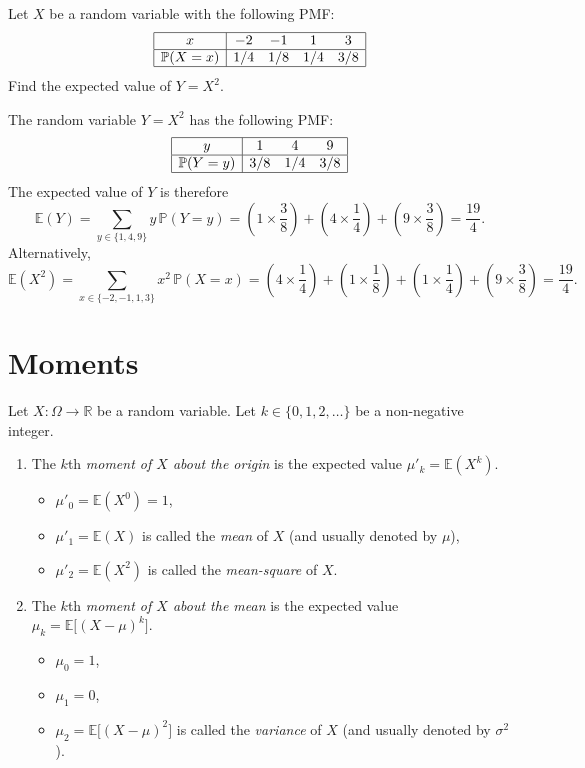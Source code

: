 \documentclass[lecture]{csm}
\newcommand{\R}{\mathbb{R}}
\newcommand{\prob}{\mathbb{P}}
\newcommand{\expe}{\mathbb{E}}
\def\it{\item}
\def\bit{\begin{itemize}}
\def\eit{\end{itemize}}
\def\ben{\begin{enumerate}}
\def\een{\end{enumerate}}
\begin{document}
\begin{example}
Let $X$ be a random variable with the following PMF:
\[\begin{array}{|c|cccc|}\hline
x 			& -2		& -1		& 1		& 3	\\ \hline
\prob(X=x)	& 1/4	& 1/8	& 1/4	& 3/8 \\ \hline
\end{array}\]
Find the expected value of $Y=X^2$.
\end{example}

\begin{solution}
The random variable $Y=X^2$ has the following PMF:
\[\begin{array}{|c|ccc|}\hline
y			& 1		& 4		& 9	\\ \hline
\prob(Y=y)	& 3/8	& 1/4	& 3/8	\\ \hline
\end{array}\]
The expected value of $Y$ is therefore
\[
\expe(Y) 
	= \sum_{y\in\{1,4,9\}} y\,\prob(Y=y) 
	= \left(1\times\frac{3}{8}\right) + \left(4\times\frac{1}{4}\right) + \left(9\times\frac{3}{8}\right) 
	= \frac{19}{4}.
\]
Alternatively,
\[
\expe(X^2)
	= \sum_{x\in\{-2,-1,1,3\}} x^2\,\prob(X=x) 
	= \left(4\times\frac{1}{4}\right) + \left(1\times\frac{1}{8}\right) + \left(1\times\frac{1}{4}\right) + \left(9\times\frac{3}{8}\right) 
	= \frac{19}{4}.
\]
\end{solution}


\section{Moments} 

\begin{definition}
Let $X:\Omega\to\R$ be a random variable. Let $k\in\{0,1,2,\ldots\}$ be a non-negative integer.
\ben
\it The $k$th \emph{moment of $X$ about the origin} is the expected value $\mu'_k = \expe(X^k)$.
	\bit
	\it $\mu'_0 = \expe(X^0) = 1$,
	\it $\mu'_1 = \expe(X)$ is called the \emph{mean} of $X$ (and usually denoted by $\mu$),
	\it $\mu'_2 = \expe(X^2)$ is called the \emph{mean-square} of $X$.
	\eit
\it The $k$th \emph{moment of $X$ about the mean} is the expected value $\mu_k = \expe\big[(X-\mu)^k\big]$.
	\bit
	\it $\mu_0 = 1$,
	\it $\mu_1 = 0$,
	\it $\mu_2 = \expe\big[(X-\mu)^2\big]$ is called the \emph{variance} of $X$ (and usually denoted by $\sigma^2$).
	\eit
\een
\end{definition}
\end{document}
